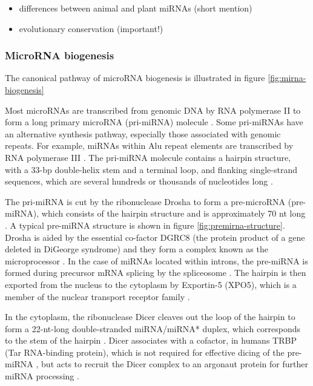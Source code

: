 \begin{itemize}
\item
  differences between animal and plant miRNAs (short mention)
\item
  evolutionary conservation (important!)
\end{itemize}


 



\subsubsection{MicroRNA biogenesis}\label{microrna-biogenesis}

The canonical pathway of microRNA biogenesis is illustrated in figure
\ref{fig:mirna-biogenesis}

Most microRNAs are transcribed from genomic DNA by RNA polymerase II to form a
long primary microRNA (pri-miRNA) molecule \citep{Lee2004}. Some pri-miRNAs
have an alternative synthesis pathway, especially those associated with
genomic repeats. For example, miRNAs within Alu repeat elements are
transcribed by RNA polymerase III \citep{Borchert2006}. The pri-miRNA molecule
contains a hairpin structure, with a 33-bp double-helix stem and a terminal
loop, and flanking single-strand sequences, which are several hundreds or
thousands of nucleotides long \citep{Kim2005}.

The pri-miRNA is cut by the ribonuclease Drosha to form%
a pre-microRNA (pre-miRNA), which consists of the hairpin structure and is
approximately 70 nt long \citep{Lee2003}. A typical pre-miRNA structure is
shown in figure \ref{fig:premirna-structure}. Drosha is aided by the essential
co-factor DGRC8 (the protein product of a gene deleted in DiGeorge syndrome)
and they form a complex known as the microprocessor \citep{Gregory2004}. In
the case of miRNAs located within introns, the pre-miRNA is formed during
precursor mRNA splicing by the spliceosome \citep{Ruby2007}. The hairpin is
then exported from the nucleus to the cytoplasm by Exportin-5 (XPO5), which is
a member of the nuclear transport receptor family
\citep{Lund2004}.

In the cytoplasm, the ribonuclease Dicer cleaves out the loop of the hairpin
to form a 22-nt-long double-stranded miRNA/miRNA* duplex, which corresponds to
the stem of the hairpin \citep{Bernstein2001,Park2011}.
Dicer associates with a cofactor, in humans TRBP (Tar RNA-binding protein),
which is not required for effective dicing of the pre-miRNA \citep{Zhang2004},
but acts to recruit the Dicer complex to an argonaut protein
for further miRNA processing \citep{Chendrimada2005}.


